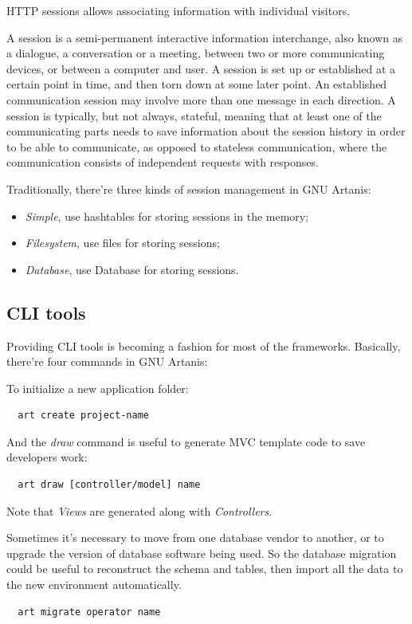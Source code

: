 \documentclass[preprint,numbers,numberedpars,10pt]{sigplanconf}
\begin{document}
HTTP sessions allows associating information with individual visitors.

A session is a semi-permanent interactive information interchange, also known as a dialogue, a conversation or a meeting, between two or more
communicating devices, or between a computer and user. A session is set up or established at a certain point in time, and then
torn down at some later point. An established communication session may involve more than one message in each direction. A session is typically,
but not always, stateful, meaning that at least one of the communicating parts needs to save information about the session history in order to be
able to communicate, as opposed to stateless communication, where the communication consists of independent requests with responses.

Traditionally, there're three kinds of session management in GNU Artanis:

\begin{itemize}
\item {\it Simple}, use hashtables for storing sessions in the memory;
\item {\it Filesystem}, use files for storing sessions;
\item {\it Database}, use Database for storing sessions.
\end{itemize}

\subsection{CLI tools} \label{CLI tools}

Providing CLI tools is becoming a fashion for most of the frameworks.
Basically, there're four commands in GNU Artanis:

To initialize a new application folder:
\begin{lstlisting}
  art create project-name
\end{lstlisting}

And the {\it draw} command is useful to generate MVC template code to save developers work:
\begin{lstlisting}
  art draw [controller/model] name
\end{lstlisting}
Note that {\it Views} are generated along with {\it Controllers}.

Sometimes it's necessary to move from one database vendor to another, or to upgrade the version of database software being used.
So the database migration could be useful to reconstruct the schema and tables, then import all the data to the new environment automatically.
\begin{lstlisting}
  art migrate operator name
\end{lstlisting}
\end{document}
